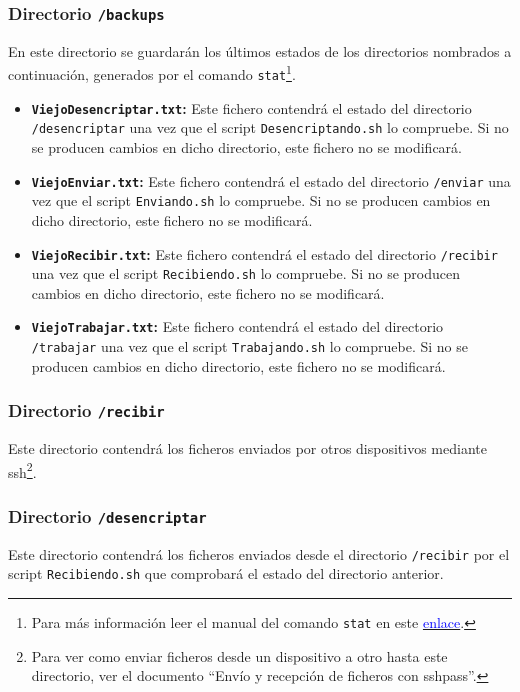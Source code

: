\subsubsection{Directorio \texttt{/backups}}
En este directorio se guardarán los últimos estados de los directorios nombrados a continuación, generados por el comando \texttt{stat}\footnote{Para más información leer el manual del comando \texttt{stat} en este \href{https://linux.die.net/man/2/stat}{\textcolor{blue}{enlace}}.}.
\begin{itemize}
	\item \textbf{\texttt{ViejoDesencriptar.txt}:} Este fichero contendrá el estado del directorio \texttt{/desencriptar} una vez que el script \texttt{Desencriptando.sh} lo compruebe. Si no se producen cambios en dicho directorio, este fichero no se modificará.
	\item \textbf{\texttt{ViejoEnviar.txt}:} Este fichero contendrá el estado del directorio \texttt{/enviar} una vez que el script \texttt{Enviando.sh} lo compruebe. Si no se producen cambios en dicho directorio, este fichero no se modificará.
	\item \textbf{\texttt{ViejoRecibir.txt}:} Este fichero contendrá el estado del directorio \texttt{/recibir} una vez que el script \texttt{Recibiendo.sh} lo compruebe. Si no se producen cambios en dicho directorio, este fichero no se modificará.
	\item \textbf{\texttt{ViejoTrabajar.txt}:} Este fichero contendrá el estado del directorio \texttt{/trabajar} una vez que el script \texttt{Trabajando.sh} lo compruebe. Si no se producen cambios en dicho directorio, este fichero no se modificará.
\end{itemize}

\subsubsection{Directorio \texttt{/recibir}}
Este directorio contendrá los ficheros enviados por otros dispositivos mediante ssh\footnote{Para ver como enviar ficheros desde un dispositivo a otro hasta este directorio, ver el documento ``Envío y recepción de ficheros con sshpass''.}.

\subsubsection{Directorio \texttt{/desencriptar}}
Este directorio contendrá los ficheros enviados desde el directorio \texttt{/recibir} por el script \texttt{Recibiendo.sh} que comprobará el estado del directorio anterior.

